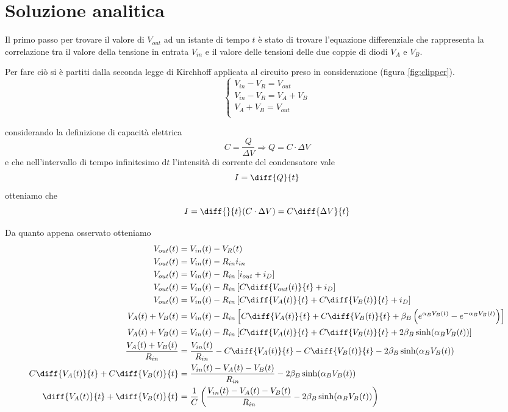 \raggedbottom
\chapter{Soluzione analitica}
	Il primo passo per trovare il valore di $V_{out}$ ad un istante di tempo $t$ è stato di trovare l'equazione differenziale che rappresenta la correlazione tra il valore della tensione in entrata $V_{in}$ e il valore delle tensioni delle due coppie di diodi $V_{A}$ e $V_{B}$.
	
	Per fare ciò si è partiti dalla seconda legge di Kirchhoff applicata al circuito preso in considerazione (figura \ref{fig:clipper}).
	\[
	\begin{cases}
		V_{in}-V_{R} = V_{out}\\
		V_{in}-V_{R} = V_{A}+V_{B}\\
		V_{A}+V_{B} = V_{out}\\
	\end{cases}
	\]
	
	considerando la definizione di capacità elettrica
	\[
		C = \frac{Q}{\Delta V} \Rightarrow Q = C \cdot \Delta V
	\]
	e che nell'intervallo di tempo infinitesimo $\mathrm{d}t$ l'intensità di corrente del condensatore vale 
	\[
		I = \diff{Q}{t}
	\]
	otteniamo che
	\[
		I = \diff{}{t}(C \cdot \Delta V) = C\diff{\Delta V}{t}
	\]
	\pagebreak
	
	Da quanto appena osservato otteniamo
	\begin{equation}
		\label{eq:differenziale}
		\begin{split}
			V_{out}(t) &= V_{in}(t)-V_{R}(t)\\
			V_{out}(t) &= V_{in}(t)-R_{in}i_{in}\\
			V_{out}(t) &= V_{in}(t)-R_{in}\left[i_{out}+i_{D}\right]\\
			V_{out}(t) &= V_{in}(t)-R_{in}\left[C\diff{V_{out}(t)}{t}+i_{D}\right]\\
			V_{out}(t) &= V_{in}(t)-R_{in}\left[C\diff{V_{A}(t)}{t}+C\diff{V_{B}(t)}{t}+i_{D}\right]\\
			V_{A}(t)+V_{B}(t) &= V_{in}(t)-R_{in}\left[C\diff{V_{A}(t)}{t}+C\diff{V_{B}(t)}{t}+\beta_{B}\left(e^{\alpha_{B}V_{B}(t)}-e^{-\alpha_{B}V_{B}(t)}\right)\right]\\
			V_{A}(t)+V_{B}(t) &= V_{in}(t)-R_{in}\left[C\diff{V_{A}(t)}{t}+C\diff{V_{B}(t)}{t}+2\beta_{B}\sinh(\alpha_{B}V_{B}(t))\right]\\
			\frac{V_{A}(t)+V_{B}(t)}{R_{in}} &= \frac{V_{in}(t)}{R_{in}}-C\diff{V_{A}(t)}{t}-C\diff{V_{B}(t)}{t}-2\beta_{B}\sinh(\alpha_{B}V_{B}(t))\\
			C\diff{V_{A}(t)}{t}+C\diff{V_{B}(t)}{t} &= \frac{V_{in}(t)-V_{A}(t)-V_{B}(t)}{R_{in}}-2\beta_{B}\sinh(\alpha_{B}V_{B}(t))\\
			\diff{V_{A}(t)}{t}+\diff{V_{B}(t)}{t} &= \frac{1}{C}\left(\frac{V_{in}(t)-V_{A}(t)-V_{B}(t)}{R_{in}}-2\beta_{B}\sinh(\alpha_{B}V_{B}(t))\right)\\
		\end{split}
	\end{equation}
	\pagebreak
	
